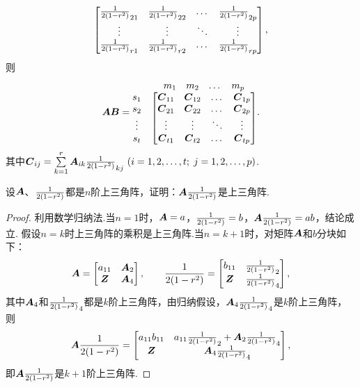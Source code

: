 \begin{theorem}
\begin{enumerate}
\begin{align*}
\begin{matrix}
\begin{bmatrix}
\B_{21} & \B_{22} & \dots & \B_{2p} \\
\vdots & \vdots & \ddots & \vdots \\
\B_{r1} & \B_{r2} & \dots & \B_{rp}
\end{bmatrix},
\end{matrix}
\end{align*}
则
\begin{align*}
\mat{AB} = \begin{matrix}
& \begin{matrix} m_1 & m_2 & \dots & m_p \end{matrix} \\
\begin{matrix} s_1 \\ s_2 \\ \vdots \\ s_t \end{matrix} & \begin{bmatrix}
\C_{11} & \C_{12} & \dots & \C_{1p} \\
\C_{21} & \C_{22} & \dots & \C_{2p} \\
\vdots & \vdots & \ddots & \vdots \\
\C_{t1} & \C_{t2} & \dots & \C_{tp}
\end{bmatrix}
\end{matrix}.
\end{align*}
其中\(\C_{ij}=\sum\limits_{k=1}^r \A_{ik} \B_{kj}\ (i=1,2,\dotsc,t;\;j=1,2,\dotsc,p)\).
\end{enumerate}
\end{theorem}

\begin{example}
设\(\A\)、\(\B\)都是\(n\)阶上三角阵，证明：\(\A\B\)是上三角阵.
\begin{proof}
利用数学归纳法.当\(n=1\)时，\(\A=a\)，\(\B=b\)，\(\A\B = ab\)，结论成立.
假设\(n=k\)时上三角阵的乘积是上三角阵.当\(n=k+1\)时，对矩阵\(\A\)和\(b\)分块如下：\[
\A = \begin{bmatrix}
a_{11} & \A_2 \\
\z & \A_4
\end{bmatrix},
\qquad
\B = \begin{bmatrix}
b_{11} & \B_2 \\
\z & \B_4
\end{bmatrix},
\]其中\(\A_4\)和\(\B_4\)都是\(k\)阶上三角阵，由归纳假设，\(\A_4 \B_4\)是\(k\)阶上三角阵，则\[
\A\B = \begin{bmatrix}
a_{11} b_{11} & a_{11} \B_2 + \A_2 \B_4 \\
\z & \A_4 \B_4
\end{bmatrix},
\]即\(\A\B\)是\(k+1\)阶上三角阵.
\end{proof}
\end{example}

